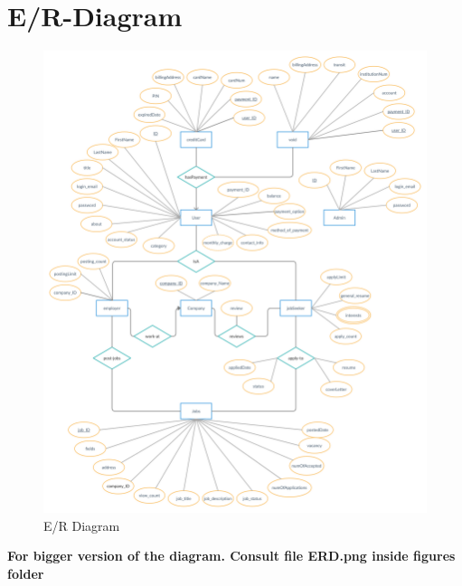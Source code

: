 \newpage
\section{E/R-Diagram}
\graphicspath{ {./figures/} }
\begin{figure}[h]
    \centering
    \includegraphics[scale=0.13]{ERD.png}
    \caption{E/R Diagram}
    \label{E/R-Diagram}
\end{figure}
\textbf{For bigger version of the diagram. Consult file ERD.png inside figures folder}